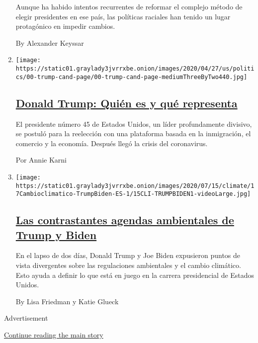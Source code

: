 \begin{enumerate}
  Aunque ha habido intentos recurrentes de reformar el complejo método
  de elegir presidentes en ese país, las políticas raciales han tenido
  un lugar protagónico en impedir cambios.

  By Alexander Keyssar
\item
  \texttt{[image: https://static01.graylady3jvrrxbe.onion/images/2020/04/27/us/politics/00-trump-cand-page/00-trump-cand-page-mediumThreeByTwo440.jpg]}

  \hypertarget{donald-trump-quiuxe9n-es-y-quuxe9-representa}{%
  \subsection{\texorpdfstring{\href{/es/interactive/2020/espanol/estados-unidos/donald-trump-elecciones.html}{Donald
  Trump: Quién es y qué
  representa}}{Donald Trump: Quién es y qué representa}}\label{donald-trump-quiuxe9n-es-y-quuxe9-representa}}

  El presidente número 45 de Estados Unidos, un líder profundamente
  divisivo, se postuló para la reelección con una plataforma basada en
  la inmigración, el comercio y la economía. Después llegó la crisis del
  coronavirus.

  Por Annie Karni
\item
  \texttt{[image: https://static01.graylady3jvrrxbe.onion/images/2020/07/15/climate/17Cambioclimatico-TrumpBiden-ES-1/15CLI-TRUMPBIDEN1-videoLarge.jpg]}

  \hypertarget{las-contrastantes-agendas-ambientales-de-trump-y-biden}{%
  \subsection{\texorpdfstring{\href{/es/2020/07/17/espanol/estados-unidos/cambio-climatico-trump-biden.html}{Las
  contrastantes agendas ambientales de Trump y
  Biden}}{Las contrastantes agendas ambientales de Trump y Biden}}\label{las-contrastantes-agendas-ambientales-de-trump-y-biden}}

  En el lapso de dos días, Donald Trump y Joe Biden expusieron puntos de
  vista divergentes sobre las regulaciones ambientales y el cambio
  climático. Esto ayuda a definir lo que está en juego en la carrera
  presidencial de Estados Unidos.

  By Lisa Friedman y Katie Glueck
\end{enumerate}

Advertisement

\protect\hyperlink{after-mid2}{Continue reading the main story}

